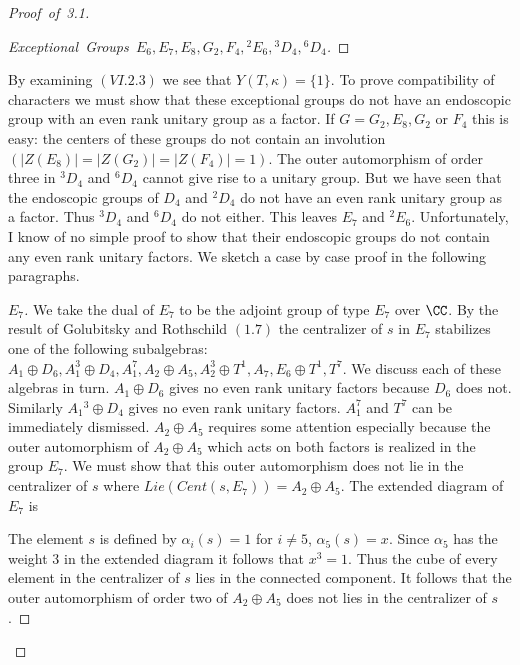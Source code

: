 \documentclass{memo-l}
\theoremstyle{definition}
\theoremstyle{remark}
\numberwithin{section}{chapter}
\numberwithin{equation}{chapter}
\begin{document}
\begin{proof}[Proof\ of\ 3.1]
\begin{proof}[Exceptional\ Groups\
$E_{6},E_{7},E_{8},G_{2},F_{4},{}^{2}E_{6},{}^{3}D_{4},{}^{6}D_{4}$]
\phantom\qedhere
\end{proof}


By examining $(VI.2.3)$ we see that $Y(T,{\kappa})  =  \{1\}$.  To prove
compatibility of characters we must show that these exceptional groups do
not have an endoscopic group with an even rank unitary group as a factor.
If $G  =  G_{2},E_{8},G_{2}$ or $F_{4}$ this is easy: the centers of these
groups do not contain an involution $(\vert Z(E_{8})\vert  =  \vert
Z(G_{2})\vert  =  \vert Z(F_{4})\vert  =  1)$.  The outer automorphism of order
three in ${}^{3}D_{4}$ and ${}^{6}D_{4}$ cannot give rise to a unitary group.
But we have seen that the endoscopic groups of $D_{4}$ and ${}^{2}D_{4}$ do
not have an even rank unitary group as a factor.  Thus ${}^{3}D_{4}$ and
${}^{6}D_{4}$ do not either.  This leaves $E_{7}$ and ${}^{2}E_{6}$.
Unfortunately, I know of no simple proof to show that their endoscopic
groups do not contain any even rank unitary factors.  We sketch a case by
case proof in the following paragraphs.

\begin{proof}[$E_{7}$] We take the dual of $E_{7}$ to be the adjoint group of type
$E_{7}$ over ${\CC}$.  By the result of Golubitsky and Rothschild
$(1.7)$ the centralizer of $s$ in $E_{7}$ stabilizes one of the following
subalgebras: $A_{1}\oplus D_{6}, A_{1}^{3}\oplus D_{4}, A_{1}^{7}, A_{2}\oplus A_{5},
A_{2}^{3}\oplus T^{1}, A_{7}, E_{6}\oplus T^{1}, T^{7}$.  We discuss each of these
algebras in turn.  $A_{1}\oplus D_{6}$ gives no even rank unitary factors
because $D_{6}$ does not.  Similarly $A_{1}{}^{3}\oplus D_{4}$ gives no even rank
unitary factors.  $A_{1}^{7}$ and $T^{7}$ can be immediately dismissed.
$A_{2}\oplus A_{5}$ requires some attention especially because the outer
automorphism of $A_{2}\oplus A_{5}$ which acts on both factors is realized in
the group $E_{7}$.  We must show that this outer automorphism does not lie
in the centralizer of $s$ where $Lie(Cent(s,E_{7}))  =  A_{2}\oplus A_{5}$.  The
extended diagram of $E_{7}$ is


\medskip

The element $s$ is defined by ${\alpha}_{i}(s) = 1$ for $i \ne 5$,
${\alpha}_{5}(s) = x$.  Since ${\alpha}_{5}$ has the weight $3$ in the
extended diagram it follows that $x^{3} = 1$.  Thus the cube of every element
in the centralizer of $s$ lies in the connected component.  It follows that
the outer automorphism of order two of $A_{2}\oplus A_{5}$ does not lies in the
centralizer of $s$.
 


\end{proof}
\end{proof}
\end{document}
